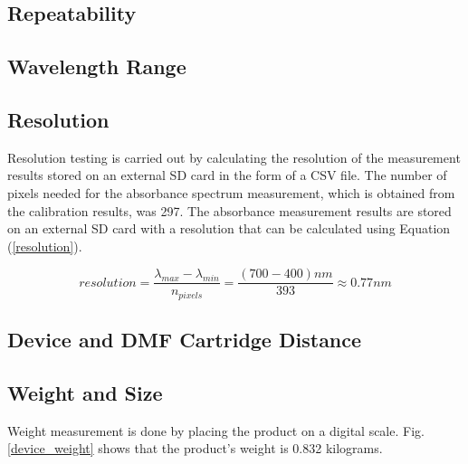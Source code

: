 \documentclass[conference]{IEEEtran}
\begin{document}
\subsection{Repeatability}
\subsection{Wavelength Range}
\subsection{Resolution}
Resolution testing is carried out by calculating the resolution of the measurement results stored on an external SD card in the form of a CSV file.
The number of pixels needed for the absorbance spectrum measurement, which is obtained from the calibration results, was 297.
The absorbance measurement results are stored on an external SD card with a resolution that can be calculated using Equation (\ref{resolution}).

\begin{equation}
    resolution=\frac{\lambda_{max} - \lambda_{min}}{n_{pixels}}=\frac{(700 - 400)nm}{393}\approx0.77nm
    \label{resolution}
    \end{equation}

\subsection{Device and DMF Cartridge Distance}

\subsection{Weight and Size}
Weight measurement is done by placing the product on a digital scale.
Fig. \ref{device_weight} shows that the product's weight is 0.832 kilograms.
\end{document}
